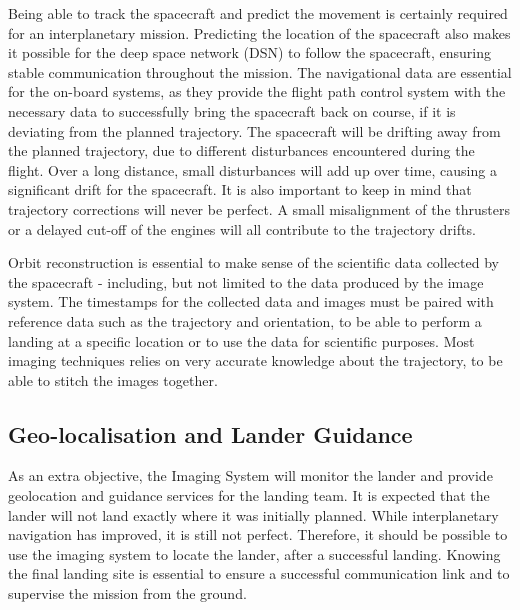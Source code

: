 Being able to track the spacecraft and predict the movement is certainly required for an interplanetary mission. Predicting the location of the spacecraft also makes it possible for the deep space network (DSN) to follow the spacecraft, ensuring stable communication throughout the mission. The navigational data are essential for the on-board systems, as they provide the flight path control system with the necessary data to successfully bring the spacecraft back on course, if it is deviating from the planned trajectory. The spacecraft will be drifting away from the planned trajectory, due to different disturbances encountered during the flight. Over a long distance, small disturbances will add up over time, causing a significant drift for the spacecraft. It is also important to keep in mind that trajectory corrections will never be perfect. A small misalignment of the thrusters or a delayed cut-off of the engines will all contribute to the trajectory drifts. %

Orbit reconstruction is essential to make sense of the scientific data collected by the spacecraft - including, but not limited to the data produced by the image system. The timestamps for the collected data and images must be paired with reference data such as the trajectory and orientation, to be able to perform a landing at a specific location or to use the data for scientific purposes. Most imaging techniques relies on very accurate knowledge about the trajectory, to be able to stitch the images together.
\subsection{Geo-localisation and Lander Guidance}
As an extra objective, the Imaging System will monitor the lander and provide geolocation and guidance services for the landing team. It is expected that the lander will not land exactly where it was initially planned. While interplanetary navigation has improved, it is still not perfect\cite{nasa2012}. Therefore, it should be possible to use the imaging system to locate the lander, after a successful landing. Knowing the final landing site is essential to ensure a successful communication link and to supervise the mission from the ground.